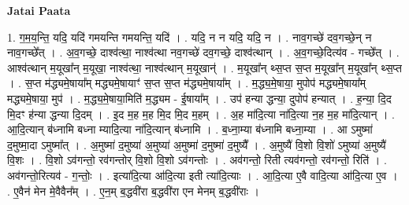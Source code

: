 \documentclass[17pt]{extarticle}
\begin{document}
\textbf{Jatai Paata} \newline

1. ग॒म॒य॒न्ति॒ यदि॒ यदि॑ गमयन्ति गमयन्ति॒ यदि॑ । . यदि॒ न न यदि॒ यदि॒ न । . नाव॒गच्छे॑ दव॒गच्छे॒न् न नाव॒गच्छे᳚त् । . अ॒व॒गच्छे॒ दाश्व॑त्था॒ नाश्व॑त्था नव॒गच्छे॑ दव॒गच्छे॒ दाश्व॑त्थान् । . अ॒व॒गच्छे॒दित्य॑व - गच्छे᳚त् । . आश्व॑त्थान् म॒यूखा᳚न् म॒यूखा॒ नाश्व॑त्था॒ नाश्व॑त्थान् म॒यूखान्॑ । . म॒यूखा᳚न् थ्स॒प्त स॒प्त म॒यूखा᳚न् म॒यूखा᳚न् थ्स॒प्त । . स॒प्त म॑द्ध्यमे॒षाया᳚म् मद्ध्यमे॒षायाꣳ॑ स॒प्त स॒प्त म॑द्ध्यमे॒षाया᳚म् । . म॒द्ध्य॒मे॒षाया॒ मुपोप॑ मद्ध्यमे॒षाया᳚म् मद्ध्यमे॒षाया॒ मुप॑ । . म॒द्ध्य॒मे॒षाया॒मिति॑ म॒द्ध्यम - ई॒षाया᳚म् । . उप॑ हन्या द्धन्या॒ दुपोप॑ हन्यात् । . ह॒न्या॒ दि॒द मि॒दꣳ ह॑न्या द्धन्या दि॒दम् । . इ॒द म॒ह म॒ह मि॒द मि॒द म॒हम् । . अ॒ह मा॑दि॒त्या ना॑दि॒त्या न॒ह म॒ह मा॑दि॒त्यान् । . आ॒दि॒त्यान् ब॑ध्नामि बध्ना म्यादि॒त्या ना॑दि॒त्यान् ब॑ध्नामि । . ब॒ध्ना॒म्या ब॑ध्नामि बध्ना॒म्या । . आ ऽमुष्मा॑ द॒मुष्मा॒दा ऽमुष्मा᳚त् । . अ॒मुष्मा॑ द॒मुष्या॑ अ॒मुष्या॑ अ॒मुष्मा॑ द॒मुष्मा॑ द॒मुष्यै᳚ । . अ॒मुष्यै॑ वि॒शो वि॒शो॑ ऽमुष्या॑ अ॒मुष्यै॑ वि॒शः । . वि॒शो ऽव॑गन्तो॒ रव॑गन्तोर् वि॒शो वि॒शो ऽव॑गन्तोः । . अव॑गन्तो॒ रिती त्यव॑गन्तो॒ रव॑गन्तो॒ रिति॑ । . अव॑गन्तो॒रित्यव॑ - ग॒न्तोः॒ । . इत्या॑दि॒त्या आ॑दि॒त्या इती त्या॑दि॒त्याः । . आ॒दि॒त्या ए॒वै वादि॒त्या आ॑दि॒त्या ए॒व । . ए॒वैन॑ मेन मे॒वैवैन᳚म् । . ए॒न॒म् ब॒द्धवी॑रा ब॒द्धवी॑रा एन मेनम् ब॒द्धवी॑राः । \newline
\end{document}
